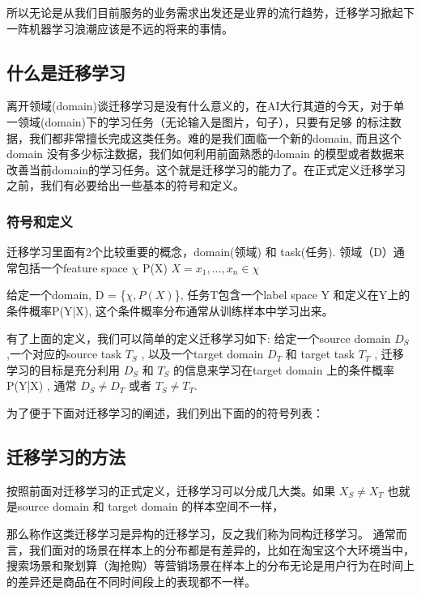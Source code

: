 所以无论是从我们目前服务的业务需求出发还是业界的流行趋势，迁移学习掀起下一阵机器学习浪潮应该是不远的将来的事情。
	
\subsection{什么是迁移学习}
离开领域(domain)谈迁移学习是没有什么意义的，在AI大行其道的今天，对于单一领域(domain)下的学习任务（无论输入是图片，句子），只要有足够
的标注数据，我们都非常擅长完成这类任务。难的是我们面临一个新的domain, 而且这个domain 没有多少标注数据，我们如何利用前面熟悉的domain
的模型或者数据来改善当前domain的学习任务。这个就是迁移学习的能力了。在正式定义迁移学习之前，我们有必要给出一些基本的符号和定义。



\subsubsection{符号和定义}
迁移学习里面有2个比较重要的概念，domain(领域) 和 task(任务). 领域（D）通常包括一个feature space $\chi$  P(X) $X = {x_1,...,x_n} \in \chi$ 

给定一个domain, D = \{$\chi,P(X)$\}, 任务T包含一个label space Y 和定义在Y上的条件概率P(Y|X), 这个条件概率分布通常从训练样本中学习出来。

有了上面的定义，我们可以简单的定义迁移学习如下: 给定一个source domain $D_S$ ,一个对应的source task  $T_S$ , 
以及一个target domain  $D_T$ 和 target task  $T_T$ , 迁移学习的目标是充分利用  $D_S$  和  $T_S$ \newline
 的信息来学习在target domain 上的条件概率 {P(Y|X)} , 通常 $D_S \neq D_T$ 或者 $T_S \neq T_T$.

为了便于下面对迁移学习的阐述，我们列出下面的的符号列表：



\subsection{迁移学习的方法}
按照前面对迁移学习的正式定义，迁移学习可以分成几大类。如果 $X_S \neq X_T$ 也就是source domain 和 target domain 的样本空间不一样，

那么称作这类迁移学习是异构的迁移学习，反之我们称为同构迁移学习。 通常而言，我们面对的场景在样本上的分布都是有差异的，比如在淘宝这个大环境当中， 
搜索场景和聚划算（淘抢购）等营销场景在样本上的分布无论是用户行为在时间上的差异还是商品在不同时间段上的表现都不一样。 

